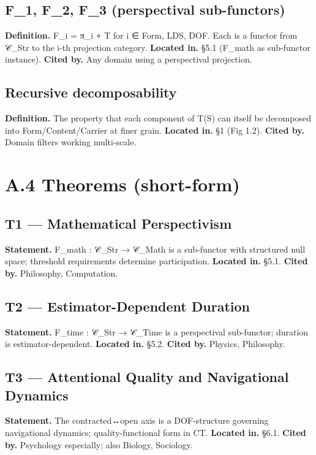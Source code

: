 \documentclass[11pt, openany]{book}
\newcommand{\sectionbreak}{\clearpage}
\begin{document}
\subsection{F\_\allowbreak{}1, F\_\allowbreak{}2, F\_\allowbreak{}3 (perspectival sub-functors)}
\textbf{Definition.} F\_\allowbreak{}i = π\_\allowbreak{}i ∘ T for i ∈ {Form, LDS, DOF}. Each is a functor from 𝒞\_\allowbreak{}Str to the i-th projection category.
\textbf{Located in.} §5.1 (F\_\allowbreak{}math as sub-functor instance).
\textbf{Cited by.} Any domain using a perspectival projection.

\subsection{Recursive decomposability}
\textbf{Definition.} The property that each component of T(S) can itself be decomposed into Form/Content/Carrier at finer grain.
\textbf{Located in.} §1 (Fig 1.2).
\textbf{Cited by.} Domain filters working multi-scale.

\sectionbreak

\section{A.4 Theorems (short-form)}

\subsection{T1 --- Mathematical Perspectivism}
\textbf{Statement.} F\_\allowbreak{}math : 𝒞\_\allowbreak{}Str → 𝒞\_\allowbreak{}Math is a sub-functor with structured null space; threshold requirements determine participation.
\textbf{Located in.} §5.1.
\textbf{Cited by.} Philosophy, Computation.

\subsection{T2 --- Estimator-Dependent Duration}
\textbf{Statement.} F\_\allowbreak{}time : 𝒞\_\allowbreak{}Str → 𝒞\_\allowbreak{}Time is a perspectival sub-functor; duration is estimator-dependent.
\textbf{Located in.} §5.2.
\textbf{Cited by.} Physics, Philosophy.

\subsection{T3 --- Attentional Quality and Navigational Dynamics}
\textbf{Statement.} The contracted↔open axis is a DOF-structure governing navigational dynamics; quality-functional form in CT.
\textbf{Located in.} §6.1.
\textbf{Cited by.} Psychology especially; also Biology, Sociology.
\end{document}

